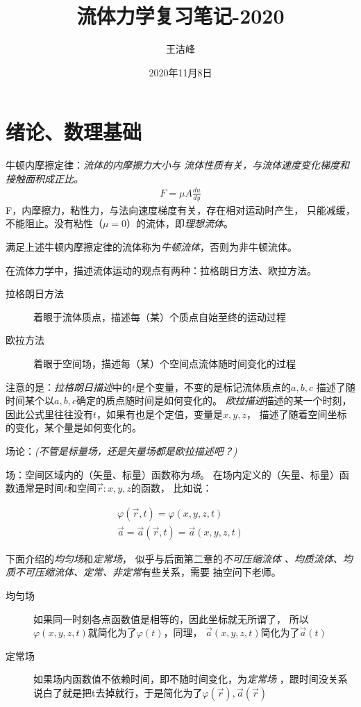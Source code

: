 \documentclass[UTF8,12pt]{article}
\title{流体力学复习笔记-2020}
\author{王洁峰}
\date{2020年11月8日}
\begin{document}
    \maketitle
    
    \newpage\tableofcontents\newpage
    
\section{绪论、数理基础}
牛顿内摩擦定律：\emph{流体的内摩擦力大小与
流体性质有关，与流体速度变化梯度和接触面积成正比。}
\begin{align*}
    F = \mu A \frac{du}{dy}
\end{align*}
F，内摩擦力，粘性力，与法向速度梯度有关，存在相对运动时产生，
只能减缓，不能阻止。没有粘性（$\mu = 0$）的流体，即\emph{理想流体}。

满足上述牛顿内摩擦定律的流体称为\emph{牛顿流体}，否则为非牛顿流体。

在流体力学中，描述流体运动的观点有两种：拉格朗日方法、欧拉方法。
\begin{description}
    \item[拉格朗日方法] 着眼于流体质点，描述每（某）个质点自始至终的运动过程
    \item[欧拉方法] 着眼于空间场，描述每（某）个空间点流体随时间变化的过程 
\end{description}

注意的是：\emph{拉格朗日描述}中的$t$是个变量，不变的是标记流体质点的$a,b,c$
描述了随时间某个以$a,b,c$确定的质点随时间是如何变化的。
\emph{欧拉描述}描述的某一个时刻，因此公式里往往没有$t$，如果有也是个定值，变量是$x,y,z$，
描述了随着空间坐标的变化，某个量是如何变化的。

场论：\emph{(不管是标量场，还是矢量场都是{\color{red}欧拉描述吧？})}

场：空间区域内的（矢量、标量）函数称为\emph{场}。
在场内定义的（矢量、标量）函数通常是时间$t$和空间$\vec r:x,y,z$的函数，
比如说：

\begin{align*}
    \varphi(\vec r,t) = \varphi (x,y,z,t)\\
    \vec a = \vec a (\vec r,t) = \vec a(x,y,z,t)
\end{align*}

下面介绍的\emph{均匀场}和\emph{定常场}，
似乎与后面第二章的\emph{不可压缩流体
、均质流体、均质不可压缩流体、定常、非定常}有些关系，需要{\color{red} 抽空问下老师}。

\begin{description}
    \item[均匀场] 如果同一时刻各点函数值是相等的，因此坐标就无所谓了，
    所以$\varphi (x,y,z,t)$就简化为了$\varphi (t)$，同理，
    $\vec a(x,y,z,t)$简化为了$\vec a(t)$
    \item[定常场] 如果场内函数值不依赖时间，即不随时间变化，为\emph{定常场}
    ，跟时间没关系说白了就是把t去掉就行，于是简化为了$\varphi (\vec r), \vec a(\vec r)$
\end{description}
\end{document}
